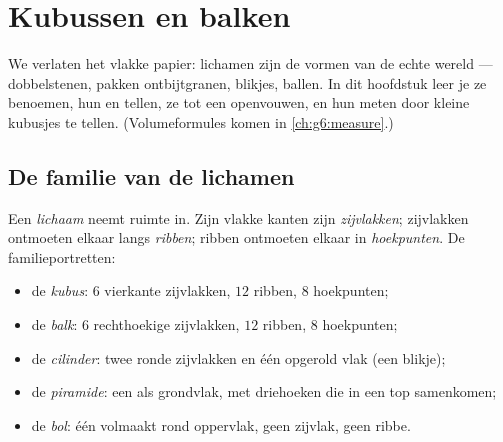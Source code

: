 \chapter{Kubussen en balken}\label{ch:g5:solids}

We verlaten het vlakke papier: lichamen zijn de vormen van de echte wereld
--- dobbelstenen, pakken ontbijtgranen, blikjes, ballen. In dit hoofdstuk
leer je ze benoemen, hun  en  tellen, ze tot een 
openvouwen, en hun  meten door kleine kubusjes te tellen.
(Volumeformules komen in \cref{ch:g6:measure}.)

\section{De familie van de lichamen}

\begin{definition}\label{def:g5:solids:def}
Een \emph{lichaam} neemt ruimte in. Zijn vlakke kanten zijn
\emph{zijvlakken}; zijvlakken ontmoeten elkaar langs
\emph{ribben}; ribben ontmoeten elkaar in
\emph{hoekpunten}. De familieportretten:
\begin{itemize}
  \item de \emph{kubus}: $6$ vierkante zijvlakken, $12$ ribben,
        $8$ hoekpunten;
  \item de \emph{balk}: $6$ rechthoekige zijvlakken, $12$
        ribben, $8$ hoekpunten;
  \item de \emph{cilinder}: twee ronde zijvlakken en één
        opgerold vlak (een blikje);
  \item de \emph{piramide}: een  als grondvlak, met
        driehoeken die in een top samenkomen;
  \item de \emph{bol}: één volmaakt rond oppervlak, geen zijvlak, geen ribbe.
\end{itemize}
\end{definition}

